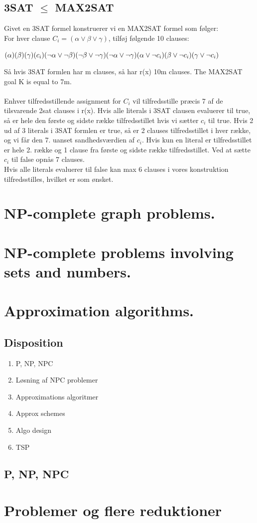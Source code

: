 \documentclass{article}
\begin{document}
\subsection{3SAT $\le$ MAX2SAT}
Givet en 3SAT formel konstruerer vi en MAX2SAT formel som følger: 
\\
For hver clause $C_i = (\alpha \lor \beta \lor \gamma)$, tilføj følgende 10 clauses:
\begin{center}
    $(\alpha)(\beta)(\gamma)(c_i)\\
    (\lnot \alpha \lor \lnot \beta)(\lnot \beta \lor \lnot \gamma)(\lnot \alpha \lor \lnot \gamma)\\
    (\alpha \lor \lnot c_i)(\beta \lor \lnot c_i)(\gamma \lor \lnot c_i)$
\end{center}
Så hvis 3SAT formlen har m clauses, så har r(x) 10m clauses. The MAX2SAT goal K is equal to 7m.\\\\
Enhver tilfredsstillende assignment for $C_i$ vil tilfredsstille præcis 7 af de tilsvarende 2sat clauses i r(x). Hvis alle literals i 3SAT clausen evaluerer til true, så er hele den første og sidste række tilfredsstillet hvis vi sætter $c_i$ til true. Hvis 2 ud af 3 literals i 3SAT formlen er true, så er 2 clauses tilfredsstillet i hver række, og vi får den 7. uanset sandhedsværdien af $c_i$. Hvis kun en literal er tilfredsstillet er hele 2. række og 1 clause fra første og sidste række tilfredsstillet. Ved at sætte $c_i$ til false opnås 7 clauses.\\
Hvis alle literals evaluerer til false kan max 6 clauses i vores konstruktion tilfredsstilles, hvilket er som ønsket. 
\newpage
\section{NP-complete graph problems.}


\newpage

\section{NP-complete problems involving sets and numbers.}


\newpage

\section{Approximation algorithms.}
\subsection{Disposition}
\begin{enumerate}
    \item P, NP, NPC
    \item Løsning af NPC problemer
    \item Approximations algoritmer
    \item Approx schemes
    \item Algo design 
    \item TSP
\end{enumerate}
\newpage
\subsection{P, NP, NPC}
\section{Problemer og flere reduktioner}

\end{document}
